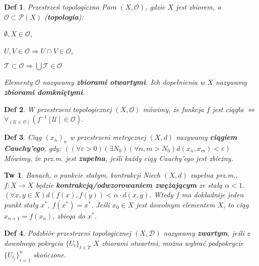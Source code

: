 \documentclass[8pt]{extarticle}
\theoremstyle{mystyle}
\newtheorem{definicja}{Def}
\newtheorem{twierdzenie}{Tw}
\newcommand{\Cal}{\mathcal}
\begin{document}
\begin{multicols*}{4}
    \begin{definicja}{Przestrzeń topologiczna}
        Para $(X, \Cal{O})$, gdzie $X$ jest zbiorem, a $\Cal{O} \subset \Cal{P}(X)$ (\textbf{topologia}):
        \begin{enumerate*}[label=\roman*]
            \item $\emptyset, X \in \Cal{O}$,
            \item $U, V \in \Cal{O} \Rightarrow U \cap V \in \Cal{O}$,
            \item $\Cal{T} \subset \Cal{O} \Rightarrow \bigcup\Cal{T} \in \Cal{O}$
        \end{enumerate*}
        Elementy $\Cal{O}$ nazywamy \textbf{zbiorami otwartymi}. Ich dopełnienia w $X$ nazywamy \textbf{zbiorami domkniętymi}.
    \end{definicja}

    \begin{definicja}
        W przestrzeni topologicznej $(X, \Cal{O})$ mówimy, że funkcja $f$ jest ciągła $\Leftrightarrow$ $\forall_{(\Cal{U} \in \Cal{O})}(f^{-1}[\Cal{U}] \in \Cal{O})$.
    \end{definicja}

    \begin{definicja}
        Ciąg ${(x_{n})}_{n}$ w przestrzeni 
        metrycznej 
        $(X, d)$ nazywamy \textbf{ciągiem Cauchy'ego}, 
        gdy:
        $((\forall \varepsilon > 0)(\exists N_0)(\forall n, m > N_0) d(x_n, x_m) < \varepsilon)$
        Mówimy, że prz.m. jest \textbf{zupełna}, jeśli każdy ciąg Cauchy'ego jest zbieżny.
    \end{definicja}

    \begin{twierdzenie}{Banach, o punkcie stałym, kontrakcji}
        Niech $(X, d)$ zupełna prz.m., $f: X \rightarrow X$ będzie \textbf{kontrakcją/odwzorowaniem zwężającym} ze stałą $\alpha < 1$.
        $(\forall x, y \in X)d(f(x), f(y)) < \alpha\cdot d(x, y)$. Wtedy $f$ ma dokładnije jeden punkt stały $x^*$, $f(x^*)=x^*$.
        Jeśli $x_0 \in X$ jest dowolnym elementem $X$, to ciąg $x_{n+1} = f(x_n)$, zbiega do $x^*$.
    \end{twierdzenie}

    \begin{definicja}
        Podzbiór przestrzeni topologicznej $(X, \Cal{D})$ nazywamy \textbf{zwartym}, jeśli z dowolnego pokrycia ${\{U_t\}}_{t\in T}$
        $X$ zbiorami otwartmi, można wybrać podpokrycie ${\{U_{t_i}\}}_{i = 1}^{n}$ skończone.
    \end{definicja}


\end{multicols*}
\end{document}
